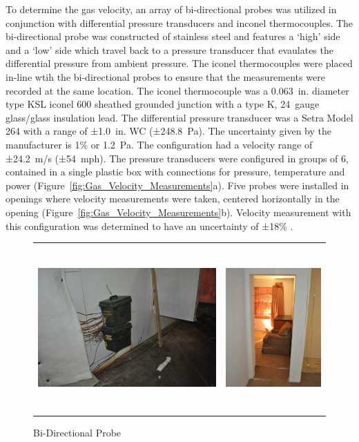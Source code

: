 \documentclass[12pt,oneside]{book}
\begin{document}
To determine the gas velocity, an array of bi-directional probes was utilized in conjunction with differential pressure transducers and inconel thermocouples. The bi-directional probe was constructed of stainless steel and features a `high' side and a `low' side which travel back to a pressure transducer that evaulates the differential pressure from ambient pressure. The iconel thermocouples were placed in-line wtih the bi-directional probes to ensure that the measurements were recorded at the same location. The iconel thermocouple was a 0.063~in. diameter type KSL iconel 600 sheathed grounded junction with a type K, 24~gauge glass/glass insulation lead. The differential pressure transducer was a Setra Model 264 with a range of ±1.0~in. WC (±248.8~Pa). The uncertainty given by the manufacturer is 1\% or 1.2~Pa. The configuration had a velocity range of ±24.2~m/s (±54~mph). The pressure transducers were configured in groups of 6, contained in a single plastic box with connections for pressure, temperature and power (Figure~\ref{fig:Gas_Velocity_Measurements}a). Five probes were installed in openings where velocity measurements were taken, centered horizontally in the opening (Figure~\ref{fig:Gas_Velocity_Measurements}b). Velocity measurement with this configuration was determined to have an uncertainty of ±18\% \cite{BDPInPoolFires}.

\begin{figure} [H]
	\centering
	\begin{tabular}{c c}
		\includegraphics[height = 2.5in]{0_Images/Instrumentation/PressureBox.jpg} &
		\includegraphics[height = 2.5in]{0_Images/Instrumentation/BDPArray.jpg} \\
	\end{tabular}
	\caption{Bi-Directional Probe}
	\label{fig:BDP}
\end{figure}
\end{document}
